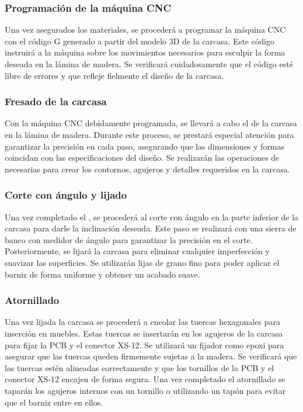 \subsubsection{Programación de la máquina \gls{CNC}}
Una vez asegurados los materiales, se procederá a programar la máquina \gls{CNC} con el código G generado a partir del modelo 3D de la carcasa. Este código instruirá a la máquina sobre los movimientos necesarios para esculpir la forma deseada en la lámina de madera. Se verificará cuidadosamente que el código esté libre de errores y que refleje fielmente el diseño de la carcasa.

\subsubsection{\gls{Fresado} de la carcasa}
Con la máquina \gls{CNC} debidamente programada, se llevará a cabo el  de la carcasa en la lámina de madera. Durante este proceso, se prestará especial atención para garantizar la precisión en cada paso, asegurando que las dimensiones y formas coincidan con las especificaciones del diseño. Se realizarán las operaciones de  necesarias para crear los contornos, agujeros y detalles requeridos en la carcasa.

\subsubsection{Corte con ángulo y lijado}
Una vez completado el , se procederá al corte con ángulo en la parte inferior de la carcasa para darle la inclinación deseada. Este paso se realizará con una sierra de banco con medidor de ángulo para garantizar la precisión en el corte. Posteriormente, se lijará la carcasa para eliminar cualquier imperfección y suavizar las superficies. Se utilizarán lijas de grano fino para poder aplicar el barniz de forma uniforme y obtener un acabado suave.

\subsubsection{Atornillado}
Una vez lijada la carcasa se procederá a encolar las tuercas hexagonales para inserción en muebles. Estas tuercas se insertarán en los agujeros de la carcasa para fijar la \gls{PCB} y el conector XS-12. Se utilizará un fijador como epoxi para asegurar que las tuercas queden firmemente sujetas a la madera. Se verificará que las tuercas estén alineadas correctamente y que los tornillos de la \gls{PCB} y el conector XS-12 encajen de forma segura. Una vez completado el atornillado se taparán los agujeros internos con un tornillo o utilizando un tapón para evitar que el barniz entre en ellos.

